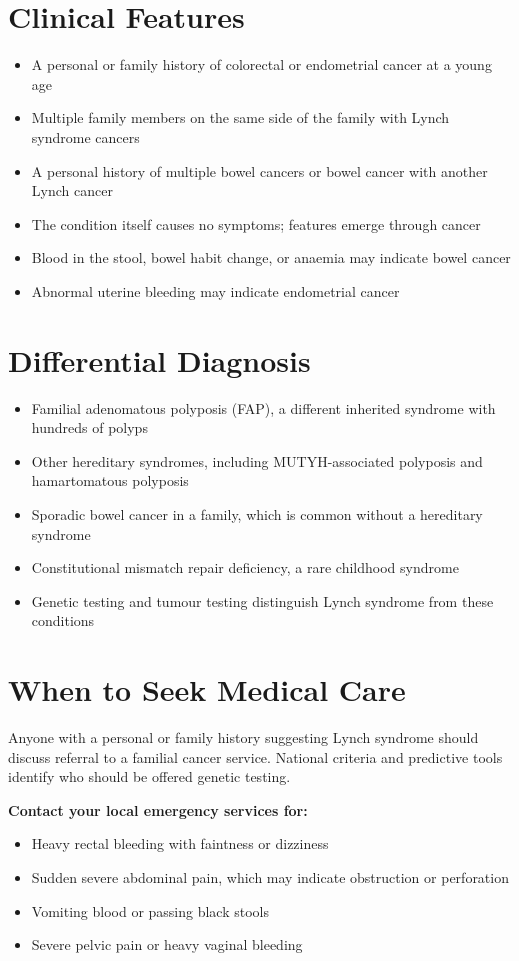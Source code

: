 \section*{Clinical Features}
\begin{itemize}
    \item A personal or family history of colorectal or endometrial cancer at a young age
    \item Multiple family members on the same side of the family with Lynch syndrome cancers
    \item A personal history of multiple bowel cancers or bowel cancer with another Lynch cancer
    \item The condition itself causes no symptoms; features emerge through cancer
    \item Blood in the stool, bowel habit change, or anaemia may indicate bowel cancer
    \item Abnormal uterine bleeding may indicate endometrial cancer
\end{itemize}

\section*{Differential Diagnosis}
\begin{itemize}
    \item Familial adenomatous polyposis (FAP), a different inherited syndrome with hundreds of polyps
    \item Other hereditary syndromes, including MUTYH-associated polyposis and hamartomatous polyposis
    \item Sporadic bowel cancer in a family, which is common without a hereditary syndrome
    \item Constitutional mismatch repair deficiency, a rare childhood syndrome
    \item Genetic testing and tumour testing distinguish Lynch syndrome from these conditions
\end{itemize}

\section*{When to Seek Medical Care}
Anyone with a personal or family history suggesting Lynch syndrome should discuss referral to a familial cancer service. National criteria and predictive tools identify who should be offered genetic testing.

\textbf{Contact your local emergency services for:}
\begin{itemize}
    \item Heavy rectal bleeding with faintness or dizziness
    \item Sudden severe abdominal pain, which may indicate obstruction or perforation
    \item Vomiting blood or passing black stools
    \item Severe pelvic pain or heavy vaginal bleeding
\end{itemize}

